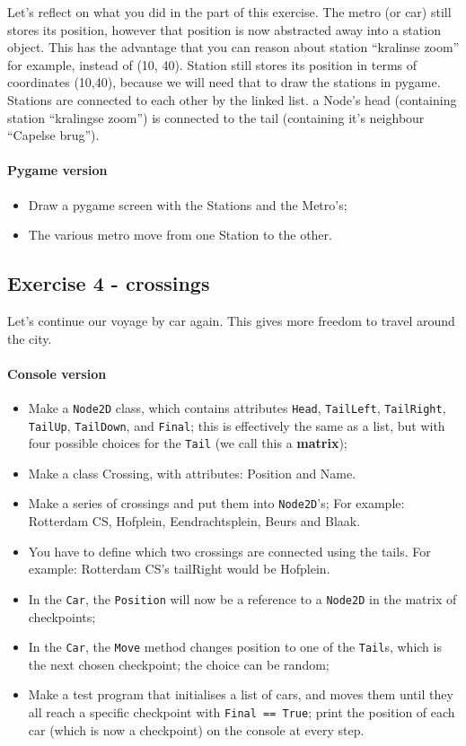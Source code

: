 \documentclass[12pt,a4paper,final]{article}
\begin{document}
			Let's reflect on what you did in the part of this exercise.
			The metro (or car) still stores its position, however that position is now abstracted away into a station object.
			This has the advantage that you can reason about station ``kralinse zoom'' for example, instead of (10, 40).
			Station still stores its position in terms of coordinates (10,40), because we will need that to draw the stations in pygame.
			Stations are connected to each other by the linked list. a Node's head (containing station ``kralingse zoom'') is connected to the tail (containing it's neighbour ``Capelse brug'').
			
			
			\paragraph*{Pygame version}
			\begin{itemize}
				\item Draw a pygame screen with the Stations and the Metro's;
				\item The various metro move from one Station to the other.
			\end{itemize}
			
		\subsection{Exercise 4 - crossings}
			Let's continue our voyage by car again. This gives more freedom to travel around the city.
			\paragraph*{Console version}
			\begin{itemize}
				\item Make a \texttt{Node2D} class,
				which contains attributes
				\texttt{Head}, \texttt{TailLeft}, \texttt{TailRight}, \texttt{TailUp}, \texttt{TailDown}, and \texttt{Final};
				this is effectively the same as a list,
				but with four possible choices for the \texttt{Tail} (we call this a \textbf{matrix});
				\item Make a class Crossing, with attributes: Position and Name.
				\item Make a series of crossings and put them into \texttt{Node2D}'s; For example: Rotterdam CS, Hofplein, Eendrachtsplein, Beurs and Blaak.
				\item You have to define which two crossings are connected using the tails. For example: Rotterdam CS's tailRight would be Hofplein.
				\item In the \texttt{Car}, the \texttt{Position} will now be a reference to a \texttt{Node2D} in the matrix of checkpoints;
				\item In the \texttt{Car}, the \texttt{Move} method changes position to one of the \texttt{Tail}s, which is the next chosen checkpoint; the choice can be random;
				\item Make a test program that initialises a list of cars, and moves them until they all reach a specific checkpoint with \texttt{Final == True}; print the position of each car (which is now a checkpoint) on the console at every step.
			\end{itemize}
			
\end{document}
